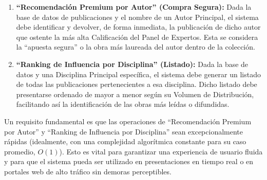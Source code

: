 \documentclass[12pt]{article}
\begin{document}
\begin{enumerate}
    \item \textbf{``Recomendación Premium por Autor'' (Compra Segura):} Dada la base de datos
    de publicaciones y el nombre de un Autor Principal, el sistema debe identificar y
    devolver, de forma inmediata, la publicación de dicho autor que ostente la más alta
    Calificación del Panel de Expertos. Esta se considera la ``apuesta segura'' o la obra
    más laureada del autor dentro de la colección.
    
    \item \textbf{``Ranking de Influencia por Disciplina'' (Listado):} Dada la base de datos y una
    Disciplina Principal específica, el sistema debe generar un listado de todas las
    publicaciones pertenecientes a esa disciplina. Dicho listado debe presentarse
    ordenado de mayor a menor según su Volumen de Distribución, facilitando así la
    identificación de las obras más leídas o difundidas.
\end{enumerate}

Un requisito fundamental es que las operaciones de ``Recomendación Premium por
Autor'' y ``Ranking de Influencia por Disciplina'' sean excepcionalmente rápidas
(idealmente, con una complejidad algorítmica constante para su caso promedio, $O(1)$). Esto
es vital para garantizar una experiencia de usuario fluida y para que el sistema pueda ser
utilizado en presentaciones en tiempo real o en portales web de alto tráfico sin demoras
perceptibles.
\end{document}
